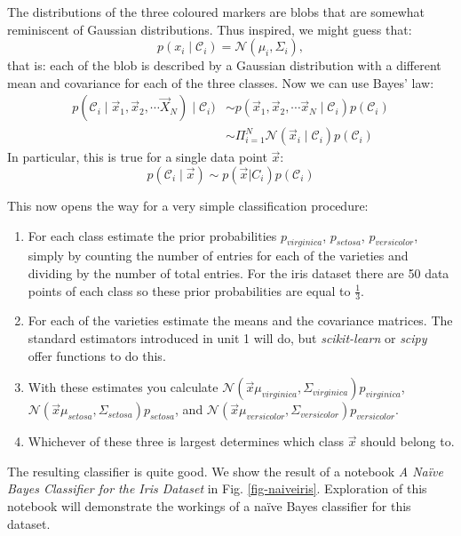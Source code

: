 The distributions of the three coloured markers are blobs that are somewhat reminiscent of Gaussian distributions. Thus inspired, we might guess that:
$$
p(x_i \mid \mathcal{C}_i) = \mathcal{N}(\mu_i, \Sigma_i),
$$
that is: each of the blob is described by a Gaussian distribution with a different mean and covariance for each of the three classes. Now we can use Bayes' law:
\begin{align}
  p(\mathcal{C}_i \mid \vec{x}_1, \vec{x}_2, \cdots \vec{X}_N) \mid \mathcal{C}_i) & \sim  p(\vec{x}_1, \vec{x}_2, \cdots \vec{x}_N \mid \mathcal{C}_i )  p(\mathcal{C}_i) \\ \nonumber
   & \sim \Pi^N_{i=1} \mathcal{N}( \vec{x}_i \mid \mathcal{C}_i) p(\mathcal{C}_i)
\end{align}
In particular, this is true for a single data point $\vec{x}$:
$$
p(\mathcal{C}_i \mid \vec{x}) \sim p( \vec{x} | C_i )p(\mathcal{C}_i)
$$

This now opens the way for a very simple classification procedure:
\begin{enumerate}
  \item For each class estimate the prior probabilities $p_{virginica}$, $p_{setosa}$, $p_{versicolor}$, simply by counting the number of entries for each of the varieties
  and dividing by the number of total entries. For the iris dataset there are 50 data points of each class so these prior probabilities are equal to $\frac{1}{3}$.

\item For each of the varieties estimate the means and the covariance matrices. The standard estimators introduced in unit 1 will do, but \emph{scikit-learn} or \emph{scipy}
  offer functions to do this.

\item With these estimates you calculate $\mathcal{N}(\vec{x} \mu_{virginica}, \Sigma_{virginica})p_{virginica}$, $\mathcal{N}(\vec{x} \mu_{setosa}, \Sigma_{setosa})p_{setosa}$, and $\mathcal{N}(\vec{x} \mu_{versicolor}, \Sigma_{versicolor})p_{versicolor}$.

\item Whichever of these three is largest determines which class $\vec{x}$ should belong to.   
\end{enumerate}

The resulting classifier is quite good. We show the result of a notebook \emph{A Na\"ive Bayes Classifier for the Iris Dataset} in Fig. \ref{fig-naiveiris}. Exploration
of this notebook will demonstrate the workings of a na\"ive Bayes classifier for this dataset.

